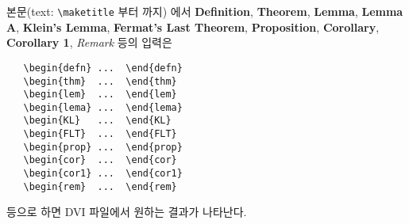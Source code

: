 \documentclass[a4paper,10pt]{amsproc}
\begin{document}
본문(text: 
\verb|\maketitle|%
부터 
\verb||%
까지) 에서 \textbf{Definition}, \textbf{Theorem},
{\bf Lemma}, \textbf{Lemma A}, \textbf{Klein's Lemma},
\textbf{Fermat's Last Theorem}, \textbf{Proposition},
\textbf{Corollary}, \textbf{Corollary 1}, {\it Remark} 등의 입력은
\begin{verbatim}
   \begin{defn} ...  \end{defn}
   \begin{thm}  ...  \end{thm}
   \begin{lem}  ...  \end{lem}
   \begin{lema} ...  \end{lema}
   \begin{KL}   ...  \end{KL}
   \begin{FLT}  ...  \end{FLT}
   \begin{prop} ...  \end{prop}
   \begin{cor}  ...  \end{cor}
   \begin{cor1} ...  \end{cor1}
   \begin{rem}  ...  \end{rem}
\end{verbatim}
등으로 하면 DVI 파일에서 원하는 결과가 나타난다.
\end{document}
